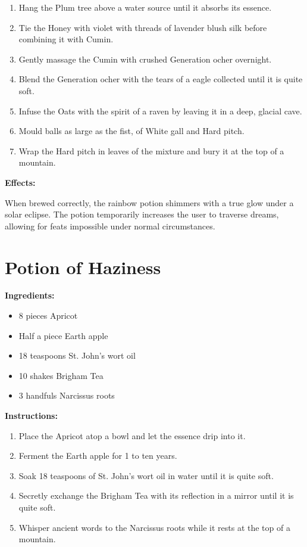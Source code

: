 \documentclass{article}
\begin{document}
\begin{enumerate}
  \item Hang the Plum tree above a water source until it absorbs its essence.
  \item Tie the Honey with violet with threads of lavender blush silk before combining it with Cumin.
  \item Gently massage the Cumin with crushed Generation ocher overnight.
  \item Blend the Generation ocher with the tears of a eagle collected until it is quite soft.
  \item Infuse the Oats with the spirit of a raven by leaving it in a deep, glacial cave.
  \item Mould balls as large as the fist, of White gall and Hard pitch.
  \item Wrap the Hard pitch in leaves of the mixture and bury it at the top of a mountain.
\end{enumerate}

\textbf{Effects:}

When brewed correctly, the rainbow potion shimmers with a true glow under a solar eclipse. The potion temporarily increases the user to traverse dreams, allowing for feats impossible under normal circumstances.

\newpage
\section*{Potion of Haziness}

\textbf{Ingredients:}

\begin{itemize}
  \item 8 pieces Apricot
  \item Half a piece Earth apple
  \item 18 teaspoons St. John's wort oil
  \item 10 shakes Brigham Tea
  \item 3 handfuls Narcissus roots
\end{itemize}

\textbf{Instructions:}

\begin{enumerate}
  \item Place the Apricot atop a bowl and let the essence drip into it.
  \item Ferment the Earth apple for 1 to ten years.
  \item Soak 18 teaspoons of St. John's wort oil in water until it is quite soft.
  \item Secretly exchange the Brigham Tea with its reflection in a mirror until it is quite soft.
  \item Whisper ancient words to the Narcissus roots while it rests at the top of a mountain.
\end{enumerate}
\end{document}
